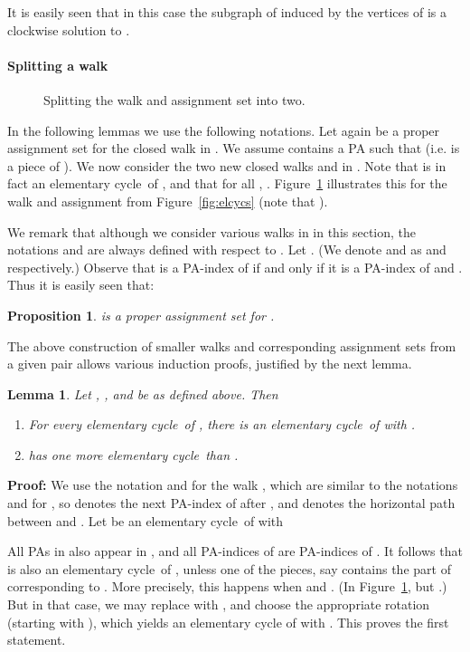 \documentclass{llncs}
\newcommand{\PF}{{\bf Proof: }}
\newcommand{\QED}{\hspace*{\fill}{}\medskip}
\def\notat#1{{}\marginpar{\raggedright{\small }}}
\newcommand{\elcyc}{elementary cycle}
\newtheorem{lem}[thm]{Lemma}
\newtheorem{propo}[thm]{Proposition}
\begin{document}
It is easily seen that in this case the subgraph of  induced by the vertices of  is a clockwise solution to .
\QED






\paragraph{Splitting a walk}
\begin{figure}
\centering
{}
\caption{Splitting the walk  and assignment set  into two.}
\label{fig:split}
\end{figure}
In the following lemmas we use the following notations. Let  again be a proper assignment set for the closed walk  in . 
We assume  contains a PA  such that  (i.e.  is a piece of ).
We now consider the two new closed walks \notat{W'} and \notat{W''} in . Note that  is in fact an \elcyc\ of , and that for all , . Figure~\ref{fig:split} illustrates this for the walk and assignment from Figure~\ref{fig:elcycs} (note that ).

We remark that although we consider various walks in  in this section, the notations  and  are always defined with respect to .
Let
\notat{A'}. 
(We denote  and  as  and  respectively.)
Observe that  is a PA-index of  if and only if it is a PA-index of  and . Thus it is easily seen that:
\begin{propo}
\label{propo:newASisproper}
 is a proper assignment set for .
\end{propo}

The above construction of smaller walks and corresponding assignment sets from a given pair  allows various induction proofs, justified by the next lemma.


\begin{lem}
\label{lem:inductionable}
Let , ,  and  be as defined above. 
Then
\begin{enumerate}
\item
For every \elcyc\  of , there is an \elcyc\  of  with .
\item
 has one more \elcyc\ than .
\end{enumerate}
\end{lem} 
\PF
We use the notation  and  for the walk , which are similar to the notations  and  for , so  denotes the next PA-index of  after , and  denotes the horizontal path between  and .
Let  be an \elcyc\ of  with

All PAs in  also appear in , and all PA-indices of  are PA-indices of . It follows that  is also an \elcyc\ of , unless one of the pieces, say  contains the part of  corresponding to . More precisely, this happens when  and . 
(In Figure~\ref{fig:split},  but .)
But in that case, we may replace  with , and choose the appropriate rotation (starting with ), which yields an elementary cycle  of  with . This proves the first statement.
\end{document}
